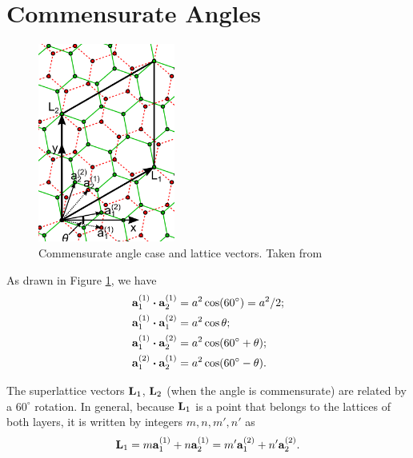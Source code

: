 \documentclass[a4paper,10pt]{article}
\begin{document}
\section{Commensurate Angles}


\begin{figure}[H]
\centering
\includegraphics[width=0.4\textwidth]{fig/latvec.png}
\caption{Commensurate angle case and lattice vectors. Taken from \cite{koshino2012}}
\label{fig:latvec}
\end{figure}

As drawn in Figure \ref{fig:latvec}, we have
\begin{align}
\label{eq:scalarprods1}
\vb{a}_1^{(1)} \vdot \vb{a}_2^{(1)} &= a^2 \cos(60^\circ) = a^2/2; \\
\label{eq:scalarprods2}
\vb{a}_1^{(1)} \vdot \vb{a}_1^{(2)} &= a^2 \cos\theta; \\
\label{eq:scalarprods3}
\vb{a}_1^{(1)} \vdot \vb{a}_2^{(2)} &= a^2 \cos(60^\circ + \theta); \\
\label{eq:scalarprods4}
\vb{a}_1^{(2)} \vdot \vb{a}_2^{(1)} &= a^2 \cos(60^\circ - \theta).
\end{align}

The superlattice vectors $\vb{L}_1$, $\vb{L}_2$ (when the angle is commensurate) are related by a $60^\circ$ rotation. In general, because $\vb{L}_1$ is a point that belongs to the lattices of both layers, it is written by integers $m,n,m',n'$ as
\begin{equation} \label{eq:L1}
\vb{L}_1 = m\vb{a}_1^{(1)} + n\vb{a}_2^{(1)} = m'\vb{a}_1^{(2)} + n'\vb{a}_2^{(2)}.
\end{equation}
\end{document}
